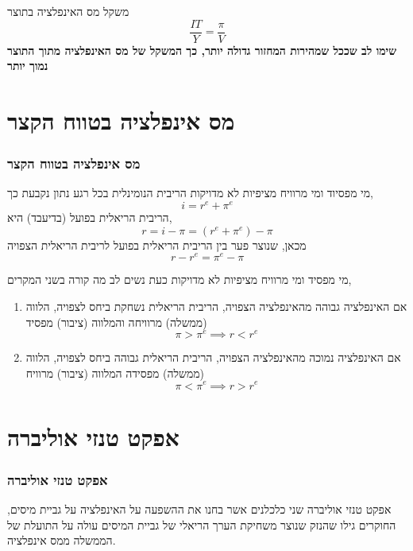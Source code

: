 \documentclass[usenames,dvipsnames]{beamer}
\begin{document}
\begin{RTL}
\begin{frame}
    \begin{block}{משקל מס האינפלציה בתוצר}
        \begin{equation*}
            \frac{IT}{Y} = \frac{\pi}{V}
        \end{equation*}    
        \textbf{שימו לב שככל שמהירות המחזור גדולה יותר, כך המשקל של מס האינפלציה מתוך התוצר נמוך יותר}
    \end{block}
    
    
    

\end{frame}

\section{מס אינפלציה בטווח הקצר}
\begin{frame}[allowframebreaks]
    \frametitle{מס אינפלציה בטווח הקצר}
    \begin{block}{מי מפסיוד ומי מרוויח מציפיות לא מדויקות}
        הריבית הנומינלית בכל רגע נתון נקבעת כך, 
        $$i = r^e + \pi^e$$
        הריבית הריאלית בפועל (בדיעבד) היא,
        $$r = i - \pi = (r^e + \pi^e) - \pi$$
        מכאן, שנוצר פער בין הריבית הריאלית בפועל לריבית הריאלית הצפויה
        $$r - r^e = \pi^e - \pi$$ 
    \end{block}
    \framebreak
    \begin{block}{מי מפסיד ומי מרוויח מציפיות לא מדויקות}
    כעת נשים לב מה קורה בשני המקרים,
    \begin{enumerate}
        \item אם האינפלציה גבוהה מהאינפלציה הצפויה, הריבית הריאלית נשחקת ביחס לצפויה, הלווה (ממשלה) מרוויחה והמלווה (ציבור) מפסיד
        $$\pi > \pi^e \implies r < r^e$$
        \item אם האינפלציה נמוכה מהאינפלציה הצפויה, הריבית הריאלית גבוהה ביחס לצפויה, הלווה (ממשלה) מפסידה המלווה (ציבור) מרוויח 
        $$\pi < \pi^e \implies r > r^e$$
    \end{enumerate}
    \end{block}

\end{frame}


\section {אפקט טנזי אוליברה}
\begin{frame}
    \frametitle{אפקט טנזי אוליברה}
    \begin{block}{אפקט טנזי אוליברה}
        שני כלכלנים אשר בחנו את ההשפעה על האינפלציה על גביית מיסים, החוקרים גילו שהנזק שנוצר משחיקת
הערך הריאלי של גביית המיסים עולה על התועלת של הממשלה ממס אינפלציה. 
    \end{block}
    

\end{frame}
\end{RTL}
\end{document}
